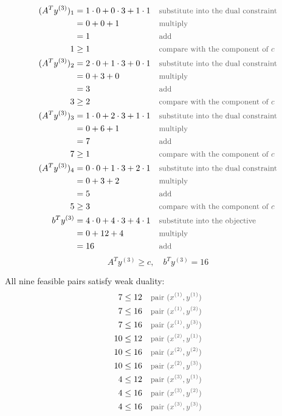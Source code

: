 \documentclass[a4paper,11pt]{article}
\newif\ifexplain
\newcommand{\why}[1]{\text{\small\color{black!65}#1}}
\newcommand{\explain}[1]{\ifexplain\begin{erklbox}#1\end{erklbox}\fi}
\begin{document}
\begin{align*}
(A^Ty^{(3)})_{1} &= 1\cdot 0 + 0\cdot 3 + 1\cdot 1 && \why{substitute into the dual constraint}\\
&= 0 + 0 + 1 && \why{multiply}\\
&= 1 && \why{add}\\
1 &\ge 1 && \why{compare with the component of $c$}\\
(A^Ty^{(3)})_{2} &= 2\cdot 0 + 1\cdot 3 + 0\cdot 1 && \why{substitute into the dual constraint}\\
&= 0 + 3 + 0 && \why{multiply}\\
&= 3 && \why{add}\\
3 &\ge 2 && \why{compare with the component of $c$}\\
(A^Ty^{(3)})_{3} &= 1\cdot 0 + 2\cdot 3 + 1\cdot 1 && \why{substitute into the dual constraint}\\
&= 0 + 6 + 1 && \why{multiply}\\
&= 7 && \why{add}\\
7 &\ge 1 && \why{compare with the component of $c$}\\
(A^Ty^{(3)})_{4} &= 0\cdot 0 + 1\cdot 3 + 2\cdot 1 && \why{substitute into the dual constraint}\\
&= 0 + 3 + 2 && \why{multiply}\\
&= 5 && \why{add}\\
5 &\ge 3 && \why{compare with the component of $c$}\\
b^Ty^{(3)} &= 4\cdot 0 + 4\cdot 3 + 4\cdot 1 && \why{substitute into the objective}\\
&= 0 + 12 + 4 && \why{multiply}\\
&= 16 && \why{add}
\end{align*}
\[\boxed{A^Ty^{(3)}\ge c,\quad b^Ty^{(3)}=16}\]
\explain{Beim dualen Punkt prüfen wir jede Ungleichung. Die linke Seite darf größer als die entsprechende Komponente von $c$ sein; Gleichheit ist nicht verlangt.}
All nine feasible pairs satisfy weak duality:
\begin{align*}
7 &\le 12 && \why{pair $(x^{(1)},y^{(1)})$}\\
7 &\le 16 && \why{pair $(x^{(1)},y^{(2)})$}\\
7 &\le 16 && \why{pair $(x^{(1)},y^{(3)})$}\\
10 &\le 12 && \why{pair $(x^{(2)},y^{(1)})$}\\
10 &\le 16 && \why{pair $(x^{(2)},y^{(2)})$}\\
10 &\le 16 && \why{pair $(x^{(2)},y^{(3)})$}\\
4 &\le 12 && \why{pair $(x^{(3)},y^{(1)})$}\\
4 &\le 16 && \why{pair $(x^{(3)},y^{(2)})$}\\
4 &\le 16 && \why{pair $(x^{(3)},y^{(3)})$}
\end{align*}
\end{document}
